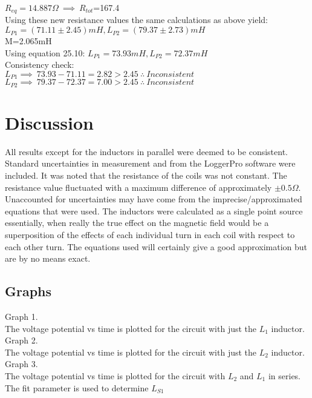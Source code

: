 \documentclass{article}
\begin{document}
$R_{eq}=14.887\Omega\ \implies\ R_{tot}$=167.4\\

Using these new resistance values the same calculations as above yield:\\
$L_{P1}=(71.11\pm2.45)mH, L_{P2}=(79.37\pm2.73)mH$\\
M=2.065mH\\

Using equation 25.10:
$L_{P1}=73.93mH, L_{P2}=72.37mH$\\

Consistency check:\\
$L_{P1}\implies\ 73.93-71.11=2.82>2.45\ \therefore\ Inconsistent$\\
$L_{P2}\implies\ 79.37-72.37=7.00>2.45\ \therefore\ Inconsistent$\\

\section{Discussion}
All results except for the inductors in parallel were deemed to be consistent. Standard uncertainties in measurement and from the LoggerPro software were included. It was noted that the resistance of the coils was not constant. The resistance value fluctuated with a maximum difference of approximately $\pm0.5\Omega$. Unaccounted for uncertainties may have come from the imprecise/approximated equations that were used. The inductors were calculated as a single point source essentially, when really the true effect on the magnetic field would be a superposition of the effects of each individual turn in each coil with respect to each other turn. The equations used will certainly give a good approximation but are by no means exact.
\subsection{Graphs}
Graph 1.\\
The voltage potential vs time is plotted for the circuit with just the $L_1$ inductor.\\

Graph 2.\\
The voltage potential vs time is plotted for the circuit with just the $L_2$ inductor.\\

Graph 3.\\
The voltage potential vs time is plotted for the circuit with $L_2$ and $L_1$ in series. The fit parameter is used to determine $L_{S1}$\\
\end{document}
